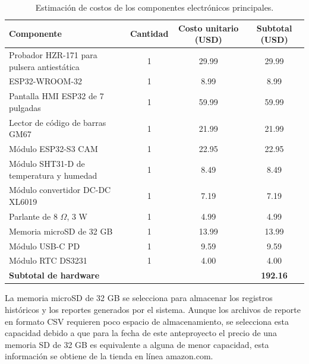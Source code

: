 \begin{table}[H]
\centering
\caption{Estimación de costos de los componentes electrónicos principales.}
\label{tab:presupuesto_hardware}
\begin{tabular}{p{5.2cm} c c c}
\toprule
\textbf{Componente} &
\textbf{Cantidad} &
\textbf{Costo unitario (USD)} &
\textbf{Subtotal (USD)} \\
\midrule

Probador HZR-171 para pulsera antiestática &
1 & 29.99 & 29.99 \\

ESP32-WROOM-32 &
1 & 8.99 & 8.99 \\

Pantalla HMI ESP32 de 7 pulgadas &
1 & 59.99 & 59.99 \\

Lector de código de barras GM67 &
1 & 21.99 & 21.99 \\

Módulo ESP32-S3 CAM &
1 & 22.95 & 22.95 \\

Módulo SHT31-D de temperatura y humedad &
1 & 8.49 & 8.49 \\

Módulo convertidor DC-DC XL6019 &
1 & 7.19 & 7.19 \\

Parlante de 8 $\Omega$, 3 W &
1 & 4.99 & 4.99 \\

Memoria microSD de 32 GB &
1 & 13.99 & 13.99 \\

Módulo USB-C PD &
1 & 9.59 & 9.59 \\

Módulo RTC DS3231 &
1 & 4.00 & 4.00 \\

\midrule
\textbf{Subtotal de hardware} &
& & \textbf{192.16} \\
\bottomrule
\end{tabular}
\end{table}

La memoria microSD de 32 GB se selecciona para almacenar los registros históricos
y los reportes generados por el sistema. Aunque los archivos de reporte en
formato CSV requieren poco espacio de almacenamiento, se selecciona esta
capacidad debido a que para la fecha de este anteproyecto el precio de una memoria SD 
de 32 GB es equivalente a alguna de menor capacidad, esta información se obtiene de 
la tienda en línea amazon.com.

